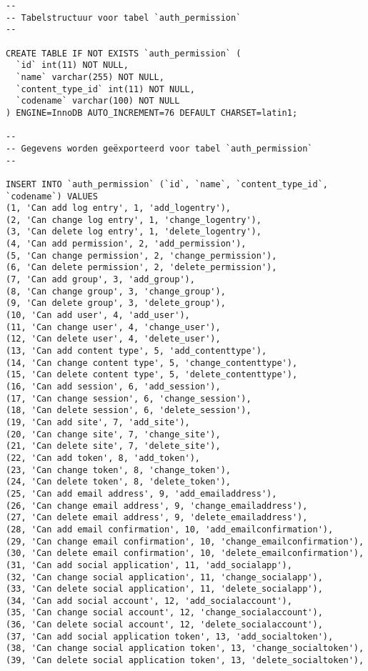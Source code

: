 \documentclass[11pt]{article}
\begin{document}
\begin{lstlisting}[style=SQL]
--
-- Tabelstructuur voor tabel `auth_permission`
--

CREATE TABLE IF NOT EXISTS `auth_permission` (
  `id` int(11) NOT NULL,
  `name` varchar(255) NOT NULL,
  `content_type_id` int(11) NOT NULL,
  `codename` varchar(100) NOT NULL
) ENGINE=InnoDB AUTO_INCREMENT=76 DEFAULT CHARSET=latin1;

--
-- Gegevens worden geëxporteerd voor tabel `auth_permission`
--

INSERT INTO `auth_permission` (`id`, `name`, `content_type_id`, `codename`) VALUES
(1, 'Can add log entry', 1, 'add_logentry'),
(2, 'Can change log entry', 1, 'change_logentry'),
(3, 'Can delete log entry', 1, 'delete_logentry'),
(4, 'Can add permission', 2, 'add_permission'),
(5, 'Can change permission', 2, 'change_permission'),
(6, 'Can delete permission', 2, 'delete_permission'),
(7, 'Can add group', 3, 'add_group'),
(8, 'Can change group', 3, 'change_group'),
(9, 'Can delete group', 3, 'delete_group'),
(10, 'Can add user', 4, 'add_user'),
(11, 'Can change user', 4, 'change_user'),
(12, 'Can delete user', 4, 'delete_user'),
(13, 'Can add content type', 5, 'add_contenttype'),
(14, 'Can change content type', 5, 'change_contenttype'),
(15, 'Can delete content type', 5, 'delete_contenttype'),
(16, 'Can add session', 6, 'add_session'),
(17, 'Can change session', 6, 'change_session'),
(18, 'Can delete session', 6, 'delete_session'),
(19, 'Can add site', 7, 'add_site'),
(20, 'Can change site', 7, 'change_site'),
(21, 'Can delete site', 7, 'delete_site'),
(22, 'Can add token', 8, 'add_token'),
(23, 'Can change token', 8, 'change_token'),
(24, 'Can delete token', 8, 'delete_token'),
(25, 'Can add email address', 9, 'add_emailaddress'),
(26, 'Can change email address', 9, 'change_emailaddress'),
(27, 'Can delete email address', 9, 'delete_emailaddress'),
(28, 'Can add email confirmation', 10, 'add_emailconfirmation'),
(29, 'Can change email confirmation', 10, 'change_emailconfirmation'),
(30, 'Can delete email confirmation', 10, 'delete_emailconfirmation'),
(31, 'Can add social application', 11, 'add_socialapp'),
(32, 'Can change social application', 11, 'change_socialapp'),
(33, 'Can delete social application', 11, 'delete_socialapp'),
(34, 'Can add social account', 12, 'add_socialaccount'),
(35, 'Can change social account', 12, 'change_socialaccount'),
(36, 'Can delete social account', 12, 'delete_socialaccount'),
(37, 'Can add social application token', 13, 'add_socialtoken'),
(38, 'Can change social application token', 13, 'change_socialtoken'),
(39, 'Can delete social application token', 13, 'delete_socialtoken'),

\end{lstlisting}
\end{document}
